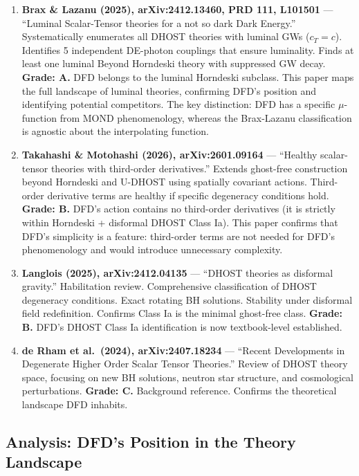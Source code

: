 \documentclass[11pt,a4paper]{article}
\begin{document}
\begin{enumerate}

\item \textbf{Brax \& Lazanu (2025), arXiv:2412.13460, PRD 111, L101501} --- ``Luminal Scalar-Tensor theories for a not so dark Dark Energy.'' Systematically enumerates all DHOST theories with luminal GWs ($c_T = c$). Identifies 5 independent DE-photon couplings that ensure luminality. Finds at least one luminal Beyond Horndeski theory with suppressed GW decay. \textbf{Grade: A.} DFD belongs to the luminal Horndeski subclass. This paper maps the full landscape of luminal theories, confirming DFD's position and identifying potential competitors. The key distinction: DFD has a specific $\mu$-function from MOND phenomenology, whereas the Brax-Lazanu classification is agnostic about the interpolating function.

\item \textbf{Takahashi \& Motohashi (2026), arXiv:2601.09164} --- ``Healthy scalar-tensor theories with third-order derivatives.'' Extends ghost-free construction beyond Horndeski and U-DHOST using spatially covariant actions. Third-order derivative terms are healthy if specific degeneracy conditions hold. \textbf{Grade: B.} DFD's action contains no third-order derivatives (it is strictly within Horndeski + disformal DHOST Class Ia). This paper confirms that DFD's simplicity is a feature: third-order terms are not needed for DFD's phenomenology and would introduce unnecessary complexity.

\item \textbf{Langlois (2025), arXiv:2412.04135} --- ``DHOST theories as disformal gravity.'' Habilitation review. Comprehensive classification of DHOST degeneracy conditions. Exact rotating BH solutions. Stability under disformal field redefinition. Confirms Class Ia is the minimal ghost-free class. \textbf{Grade: B.} DFD's DHOST Class Ia identification is now textbook-level established.

\item \textbf{de Rham et al.\ (2024), arXiv:2407.18234} --- ``Recent Developments in Degenerate Higher Order Scalar Tensor Theories.'' Review of DHOST theory space, focusing on new BH solutions, neutron star structure, and cosmological perturbations. \textbf{Grade: C.} Background reference. Confirms the theoretical landscape DFD inhabits.

\end{enumerate}

\subsection{Analysis: DFD's Position in the Theory Landscape}
\end{document}
